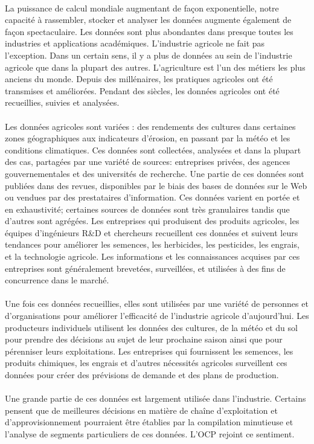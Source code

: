 \paragraph{}
La puissance de calcul mondiale augmentant de façon exponentielle, notre capacité à rassembler, stocker et analyser les données augmente également de façon spectaculaire. Les données sont plus abondantes dans presque toutes les industries et applications académiques. L'industrie agricole ne fait pas l'exception. Dans un certain sens, il y a plus de données au sein de l'industrie agricole que dans la plupart des autres. L'agriculture est l'un des métiers les plus anciens du monde. Depuis des millénaires, les pratiques agricoles ont été transmises et améliorées. Pendant des siècles, les données agricoles ont été recueillies, suivies et analysées\cite{MIT-BIGDATA}.
\paragraph{}
Les données agricoles sont variées : des rendements des cultures dans certaines zones géographiques aux indicateurs d'érosion, en passant par la météo et les conditions climatiques. Ces données sont collectées, analysées et dans la plupart des cas, partagées par une variété de sources: entreprises privées, des agences gouvernementales et des universités de recherche. Une partie de ces données sont publiées dans des revues, disponibles par le biais des bases de données sur le Web ou vendues par des prestataires d'information. Ces données varient en portée et en exhaustivité; certaines sources de données sont très granulaires tandis que d'autres sont agrégées.
Les entreprises qui produisent des produits agricoles, les équipes d'ingénieurs R\&D et chercheurs recueillent ces données et suivent leurs tendances pour améliorer les semences, les herbicides, les pesticides, les engrais, et la technologie agricole. Les informations et les connaissances acquises par ces entreprises sont généralement brevetées, surveillées, et utilisées à des fins de concurrence dans le marché. 
\paragraph{}
Une fois ces données recueillies, elles sont utilisées par une variété de personnes et d'organisations pour améliorer l'efficacité de l'industrie agricole d’aujourd’hui. Les producteurs individuels utilisent les données des cultures, de la météo et du sol pour prendre des décisions au sujet de leur prochaine saison ainsi que pour pérenniser leurs exploitations. Les entreprises qui fournissent les semences, les produits chimiques, les engrais et d'autres nécessités agricoles surveillent ces données pour créer des prévisions de demande et des plans de production.
\paragraph{} 
Une grande partie de ces données est largement utilisée dans l'industrie. Certains pensent que de meilleures décisions en matière de chaîne d'exploitation et d'approvisionnement pourraient être établies par la compilation minutieuse et l'analyse de segments particuliers de ces données. L'OCP rejoint ce sentiment.